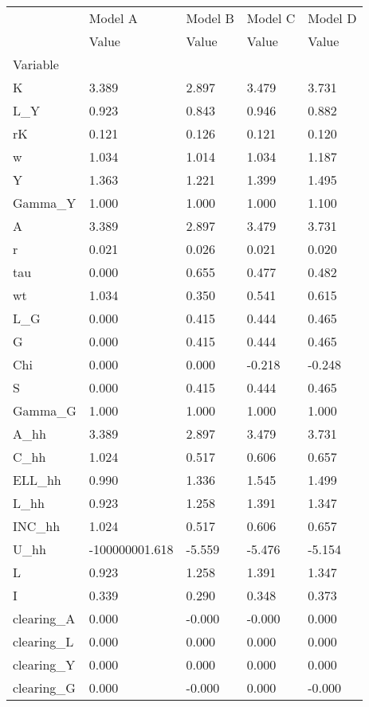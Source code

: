 \begin{tabular}{lllll}
\toprule
{} &         Model A & Model B & Model C & Model D \\
{} &           Value &   Value &   Value &   Value \\
Variable   &                 &         &         &         \\
\midrule
K          &           3.389 &   2.897 &   3.479 &   3.731 \\
L\_Y        &           0.923 &   0.843 &   0.946 &   0.882 \\
rK         &           0.121 &   0.126 &   0.121 &   0.120 \\
w          &           1.034 &   1.014 &   1.034 &   1.187 \\
Y          &           1.363 &   1.221 &   1.399 &   1.495 \\
Gamma\_Y    &           1.000 &   1.000 &   1.000 &   1.100 \\
A          &           3.389 &   2.897 &   3.479 &   3.731 \\
r          &           0.021 &   0.026 &   0.021 &   0.020 \\
tau        &           0.000 &   0.655 &   0.477 &   0.482 \\
wt         &           1.034 &   0.350 &   0.541 &   0.615 \\
L\_G        &           0.000 &   0.415 &   0.444 &   0.465 \\
G          &           0.000 &   0.415 &   0.444 &   0.465 \\
Chi        &           0.000 &   0.000 &  -0.218 &  -0.248 \\
S          &           0.000 &   0.415 &   0.444 &   0.465 \\
Gamma\_G    &           1.000 &   1.000 &   1.000 &   1.000 \\
A\_hh       &           3.389 &   2.897 &   3.479 &   3.731 \\
C\_hh       &           1.024 &   0.517 &   0.606 &   0.657 \\
ELL\_hh     &           0.990 &   1.336 &   1.545 &   1.499 \\
L\_hh       &           0.923 &   1.258 &   1.391 &   1.347 \\
INC\_hh     &           1.024 &   0.517 &   0.606 &   0.657 \\
U\_hh       &  -100000001.618 &  -5.559 &  -5.476 &  -5.154 \\
L          &           0.923 &   1.258 &   1.391 &   1.347 \\
I          &           0.339 &   0.290 &   0.348 &   0.373 \\
clearing\_A &           0.000 &  -0.000 &  -0.000 &   0.000 \\
clearing\_L &           0.000 &   0.000 &   0.000 &   0.000 \\
clearing\_Y &           0.000 &   0.000 &   0.000 &   0.000 \\
clearing\_G &           0.000 &  -0.000 &   0.000 &  -0.000 \\
\bottomrule
\end{tabular}

